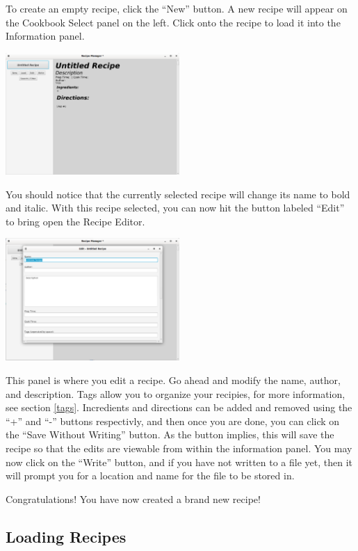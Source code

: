 \documentclass{article}
\begin{document}
To create an empty recipe, click the ``New'' button. A new recipe will
appear on the Cookbook Select panel on the left. Click onto the
recipe to load it into the Information panel.

\begin{center}
  \includegraphics[width=250px]{img/newrec.png}
\end{center}

You should notice that the currently selected recipe will change its
name to bold and italic. With this recipe selected, you can now hit
the button labeled ``Edit'' to bring open the Recipe Editor.

\begin{center}
  \includegraphics[width=250px]{img/editor.png}
\end{center}

This panel is where you edit a recipe. Go ahead and modify the name,
author, and description. Tags allow you to organize your recipies, for
more information, see section \ref{tags}. Incredients and directions
can be added and removed using the ``+'' and ``-'' buttons
respectivly, and then once you are done, you can click on the ``Save
Without Writing'' button. As the button implies, this will save the
recipe so that the edits are viewable from within the information
panel. You may now click on the ``Write'' button, and if you have not
written to a file yet, then it will prompt you for a location and name
for the file to be stored in.

Congratulations! You have now created a brand new recipe!

\subsection{Loading Recipes}
\end{document}
